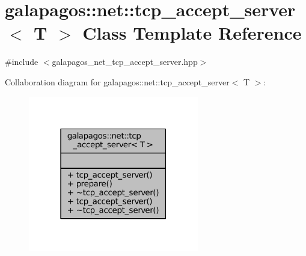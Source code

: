 \hypertarget{classgalapagos_1_1net_1_1tcp__accept__server}{}\section{galapagos\+:\+:net\+:\+:tcp\+\_\+accept\+\_\+server$<$ T $>$ Class Template Reference}
\label{classgalapagos_1_1net_1_1tcp__accept__server}


{\ttfamily \#include $<$galapagos\+\_\+net\+\_\+tcp\+\_\+accept\+\_\+server.\+hpp$>$}



Collaboration diagram for galapagos\+:\+:net\+:\+:tcp\+\_\+accept\+\_\+server$<$ T $>$\+:
\nopagebreak
\begin{figure}[H]
\begin{center}
\leavevmode
\includegraphics[width=211pt]{classgalapagos_1_1net_1_1tcp__accept__server__coll__graph}
\end{center}
\end{figure}
